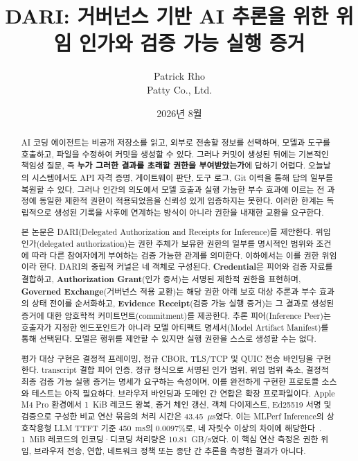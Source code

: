 \documentclass[10pt]{article}
\title{DARI: 거버넌스 기반 AI 추론을 위한 위임 인가와 검증 가능 실행 증거}
\author{Patrick Rho\\Patty Co., Ltd.}
\date{2026년 8월}
\newcommand{\dariname}{DARI}
\renewcommand{\emph}[1]{\textbf{#1}}
\begin{document}
\maketitle

\begin{abstract}
AI 코딩 에이전트는 비공개 저장소를 읽고, 외부로 전송할 정보를 선택하며, 모델과 도구를 호출하고, 파일을 수정하여 커밋을 생성할 수 있다. 그러나 커밋이 생성된 뒤에는 기본적인 책임성 질문, 즉 \emph{누가 그러한 결과를 초래할 권한을 부여받았는가}에 답하기 어렵다. 오늘날의 시스템에서도 API 자격 증명, 게이트웨이 판단, 도구 로그, Git 이력을 통해 답의 일부를 복원할 수 있다. 그러나 인간의 의도에서 모델 호출과 실행 가능한 부수 효과에 이르는 전 과정에 동일한 제한적 권한이 적용되었음을 신뢰성 있게 입증하지는 못한다. 이러한 한계는 독립적으로 생성된 기록을 사후에 연계하는 방식이 아니라 권한을 내재한 교환을 요구한다.

본 논문은 \dariname{}(Delegated Authorization and Receipts for Inference)를 제안한다. 위임 인가(delegated authorization)는 권한 주체가 보유한 권한의 일부를 명시적인 범위와 조건에 따라 다른 참여자에게 부여하는 검증 가능한 관계를 의미한다. 이하에서는 이를 권한 위임이라 한다. DARI의 중립적 커널은 네 객체로 구성된다. \emph{Credential}은 피어와 검증 자료를 결합하고, \emph{Authorization Grant}(인가 증서)는 서명된 제한적 권한을 표현하며, \emph{Governed Exchange}(거버넌스 적용 교환)는 해당 권한 아래 보호 대상 추론과 부수 효과의 상태 전이를 순서화하고, \emph{Evidence Receipt}(검증 가능 실행 증거)는 그 결과로 생성된 증거에 대한 암호학적 커미트먼트(commitment)를 제공한다. 추론 피어(Inference Peer)는 호출자가 지정한 엔드포인트가 아니라 모델 아티팩트 명세서(Model Artifact Manifest)를 통해 선택된다. 모델은 행위를 제안할 수 있지만 실행 권한을 스스로 생성할 수는 없다.

평가 대상 구현은 결정적 프레이밍, 정규 CBOR, TLS/TCP 및 QUIC 전송 바인딩을 구현한다. transcript 결합 피어 인증, 정규 형식으로 서명된 인가 범위, 위임 범위 축소, 결정적 최종 검증 가능 실행 증거는 명세가 요구하는 속성이며, 이를 완전하게 구현한 프로토콜 소스와 테스트는 아직 필요하다. 브라우저 바인딩과 도메인 간 연합은 확장 프로파일이다. Apple M4 Pro 환경에서 1~KiB 레코드 왕복, 증거 체인 갱신, 객체 다이제스트, Ed25519 서명 및 검증으로 구성한 비교 연산 묶음의 처리 시간은 43.45~$\mu$s였다. 이는 MLPerf Inference의 상호작용형 LLM TTFT 기준 450~ms의 0.0097\%로, 네 자릿수 이상의 차이에 해당한다~\cite{mlperf2025llm}. 1~MiB 레코드의 인코딩·디코딩 처리량은 10.81~GB/s였다. 이 핵심 연산 측정은 권한 위임, 브라우저 전송, 연합, 네트워크 정책 또는 종단 간 추론을 측정한 결과가 아니다.
\end{abstract}
\end{document}
